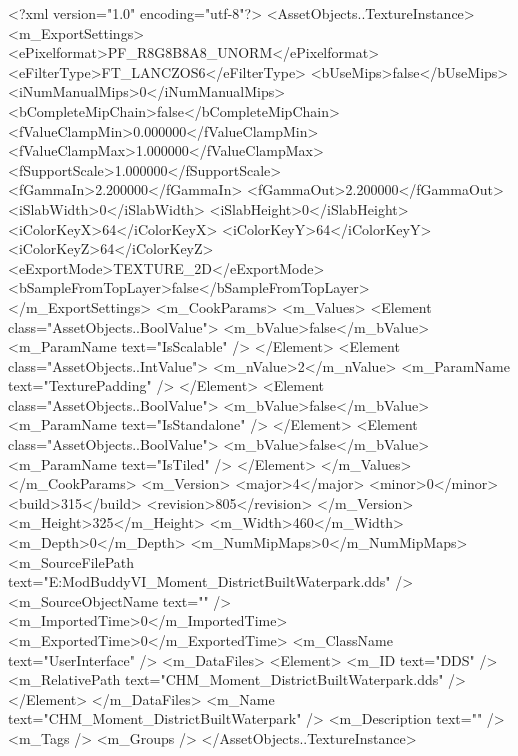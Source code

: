 ﻿<?xml version="1.0" encoding="utf-8"?>
<AssetObjects..TextureInstance>
  <m_ExportSettings>
    <ePixelformat>PF_R8G8B8A8_UNORM</ePixelformat>
    <eFilterType>FT_LANCZOS6</eFilterType>
    <bUseMips>false</bUseMips>
    <iNumManualMips>0</iNumManualMips>
    <bCompleteMipChain>false</bCompleteMipChain>
    <fValueClampMin>0.000000</fValueClampMin>
    <fValueClampMax>1.000000</fValueClampMax>
    <fSupportScale>1.000000</fSupportScale>
    <fGammaIn>2.200000</fGammaIn>
    <fGammaOut>2.200000</fGammaOut>
    <iSlabWidth>0</iSlabWidth>
    <iSlabHeight>0</iSlabHeight>
    <iColorKeyX>64</iColorKeyX>
    <iColorKeyY>64</iColorKeyY>
    <iColorKeyZ>64</iColorKeyZ>
    <eExportMode>TEXTURE_2D</eExportMode>
    <bSampleFromTopLayer>false</bSampleFromTopLayer>
  </m_ExportSettings>
  <m_CookParams>
    <m_Values>
      <Element class="AssetObjects..BoolValue">
        <m_bValue>false</m_bValue>
        <m_ParamName text="IsScalable" />
      </Element>
      <Element class="AssetObjects..IntValue">
        <m_nValue>2</m_nValue>
        <m_ParamName text="TexturePadding" />
      </Element>
      <Element class="AssetObjects..BoolValue">
        <m_bValue>false</m_bValue>
        <m_ParamName text="IsStandalone" />
      </Element>
      <Element class="AssetObjects..BoolValue">
        <m_bValue>false</m_bValue>
        <m_ParamName text="IsTiled" />
      </Element>
    </m_Values>
  </m_CookParams>
  <m_Version>
    <major>4</major>
    <minor>0</minor>
    <build>315</build>
    <revision>805</revision>
  </m_Version>
  <m_Height>325</m_Height>
  <m_Width>460</m_Width>
  <m_Depth>0</m_Depth>
  <m_NumMipMaps>0</m_NumMipMaps>
  <m_SourceFilePath text="E:\Documents\Firaxis ModBuddy\Civilization VI\ColoredHistoricMoments\ColoredHistoricMoments\Textures\CHM_Moment_DistrictBuiltWaterpark.dds" />
  <m_SourceObjectName text="" />
  <m_ImportedTime>0</m_ImportedTime>
  <m_ExportedTime>0</m_ExportedTime>
  <m_ClassName text="UserInterface" />
  <m_DataFiles>
    <Element>
      <m_ID text="DDS" />
      <m_RelativePath text="CHM_Moment_DistrictBuiltWaterpark.dds" />
    </Element>
  </m_DataFiles>
  <m_Name text="CHM_Moment_DistrictBuiltWaterpark" />
  <m_Description text="" />
  <m_Tags />
  <m_Groups />
</AssetObjects..TextureInstance>